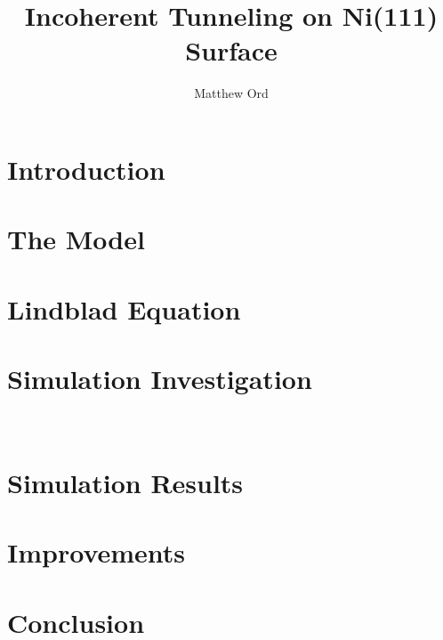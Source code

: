 \documentclass{article}
\title{Incoherent Tunneling on Ni(111) Surface} %
\author{Matthew Ord}
\date{}
\begin{document}
\maketitle

\begin{abstract}
    
\end{abstract}

\pagebreak
\section{Introduction}


\pagebreak

\section{The Model}\label{sec:the model}


\section{Lindblad Equation}\label{sec:redfield}


\section{Simulation Investigation}\label{sec:simulation}


\FloatBarrier\
\section{Simulation Results}\label{sec:simulation results}


\section{Improvements}\label{sec:improvements}


\pagebreak

\section{Conclusion}\label{sec:conclusion}

\end{document}
